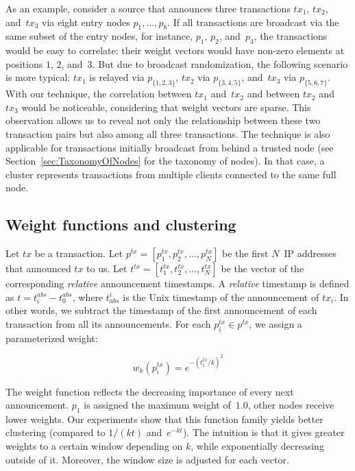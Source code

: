 As an example, consider a source that announces three transactions $tx_1$, $tx_2$, and~$tx_3$ via eight entry nodes $p_1, \dots, p_8$.
If all transactions are broadcast via the same subset of the entry nodes, for instance, $p_1$, $p_2$, and~$p_3$, the transactions would be easy to correlate: their weight vectors would have non-zero elements at positions $1$, $2$, and~$3$.
But due to broadcast randomization, the following scenario is more typical: $tx_1$ is relayed via $p_{\{1,2,3\}}$, $tx_2$ via $p_{\{3,4,5\}}$, and~$tx_3$ via $p_{\{5,6,7\}}$.
With our technique, the correlation between $tx_1$ and~$tx_2$ and between $tx_2$ and~$tx_3$ would be noticeable, considering that weight vectors are sparse.
This observation allows us to reveal not only the relationship between these two transaction pairs but also among all three transactions.
The technique is also applicable for transactions initially broadcast from behind a trusted node (see Section~\ref{sec:TaxonomyOfNodes} for the taxonomy of nodes).
In that case, a cluster represents transactions from multiple clients connected to the same full node.


\subsection{Weight functions and clustering}

Let $tx$ be a transaction.
Let $p^{tx} = [p^{tx}_1, p^{tx}_2, \dots, p^{tx}_N]$ be the first $N$~IP addresses that announced $tx$ to us.
Let $t^{tx} = [t^{tx}_1, t^{tx}_2, \dots, t^{tx}_N]$ be the vector of the corresponding \textit{relative} announcement timestamps.
A \textit{relative} timestamp is defined as $t = t^{abs}_i - t^{abs}_0$, where $t_{abs}^i$ is the Unix timestamp of the announcement of $tx_i$.
In other words, we subtract the timestamp of the first announcement of each transaction from all its announcements.
For each $p^{tx}_i \in p^{tx}$, we assign a parameterized weight:

\[
w_k(p^{tx}_i) = e^{-(t^{tx}_i/k)^2}
\]

The weight function reflects the decreasing importance of every next announcement.
$p_1$ is assigned the maximum weight of~$1.0$, other nodes receive lower weights.
Our experiments show that this function family yields better clustering (compared to $1/(kt)$ and~$e^{-kt}$).
The intuition is that it gives greater weights to a certain window depending on $k$, while exponentially decreasing outside of it.
Moreover, the window size is adjusted for each vector.

